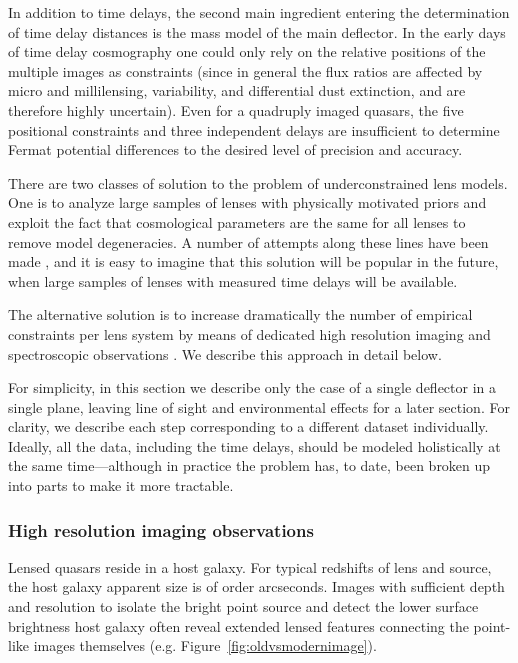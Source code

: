 In addition to time delays, the second main ingredient entering the
determination of time delay distances is the mass model of the main
deflector. In the early days of time delay cosmography one could only
rely on the relative positions of the multiple images as constraints
(since in general the flux ratios are affected by micro and
millilensing, variability, and differential dust extinction, and are
therefore highly uncertain). Even for a quadruply imaged quasars, the
five positional constraints and three independent delays are
insufficient to determine Fermat potential differences to the desired
level of precision and accuracy.

There are two classes of solution to the problem of underconstrained
lens models. One is to analyze large samples of lenses with physically
motivated priors and exploit the fact that cosmological parameters are
the same for all lenses to remove model degeneracies. A number of
attempts along these lines have been made \citep{Ogu07b,RK++2015}, and
it is easy to imagine that this solution will be popular in the
future, when large samples of lenses with measured time delays will be
available.

The alternative solution is to increase dramatically the number of
empirical constraints per lens system by means of dedicated high
resolution imaging and spectroscopic observations
\citep{Suy++10,Suy++13,Suy++14}. We describe this approach in detail
below.

For simplicity, in this section we describe only the case of a single
deflector in a single plane, leaving line of sight and environmental
effects for a later section. For clarity, we describe each step
corresponding to a different dataset individually. Ideally, all the
data, including the time delays, should be modeled holistically at the
same time---although in practice the problem has, to date, been broken up
into parts to make it more tractable.


\subsubsection{High resolution imaging observations}

Lensed quasars reside in a host galaxy. For typical redshifts of lens
and source, the host galaxy apparent size is of order
arcseconds. Images with sufficient depth and resolution to isolate the
bright point source and detect the lower surface brightness host
galaxy often reveal extended lensed features connecting the
point-like images themselves (e.g. Figure~\ref{fig:oldvsmodernimage}).

